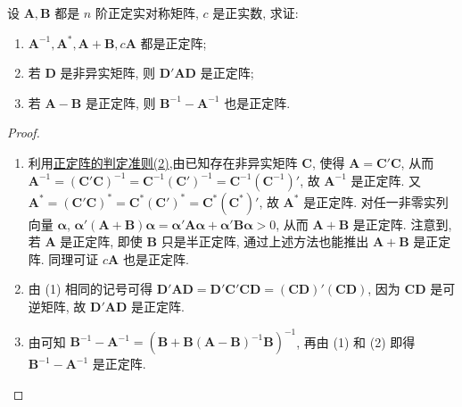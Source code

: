 \documentclass[../../main.tex]{subfiles}
\begin{document}
\begin{proposition}\label{proposition:正定阵的性质123}
设 \(\boldsymbol{A},\boldsymbol{B}\) 都是 \(n\) 阶正定实对称矩阵, \(c\) 是正实数, 求证:
\begin{enumerate}[(1)]
\item \(\boldsymbol{A}^{-1},\boldsymbol{A}^*,\boldsymbol{A}+\boldsymbol{B},c\boldsymbol{A}\) 都是正定阵;
\item 若 \(\boldsymbol{D}\) 是非异实矩阵, 则 \(\boldsymbol{D}'\boldsymbol{A}\boldsymbol{D}\) 是正定阵;
\item 若 \(\boldsymbol{A}-\boldsymbol{B}\) 是正定阵, 则 \(\boldsymbol{B}^{-1}-\boldsymbol{A}^{-1}\) 也是正定阵.
\end{enumerate}
\end{proposition}
\begin{proof}
\begin{enumerate}[(1)]
\item 利用\hyperref[proposition:正定阵的判定准则]{正定阵的判定准则(2)},由已知存在非异实矩阵 \(\boldsymbol{C}\), 使得 \(\boldsymbol{A}=\boldsymbol{C}'\boldsymbol{C}\), 从而 \(\boldsymbol{A}^{-1}=(\boldsymbol{C}'\boldsymbol{C})^{-1}=\boldsymbol{C}^{-1}(\boldsymbol{C}')^{-1}=\boldsymbol{C}^{-1}(\boldsymbol{C}^{-1})'\), 故 \(\boldsymbol{A}^{-1}\) 是正定阵. 又 \(\boldsymbol{A}^*=(\boldsymbol{C}'\boldsymbol{C})^*=\boldsymbol{C}^*(\boldsymbol{C}')^*=\boldsymbol{C}^*(\boldsymbol{C}^*)'\), 故 \(\boldsymbol{A}^*\) 是正定阵. 对任一非零实列向量 \(\boldsymbol{\alpha}\), \(\boldsymbol{\alpha}'(\boldsymbol{A}+\boldsymbol{B})\boldsymbol{\alpha}=\boldsymbol{\alpha}'\boldsymbol{A}\boldsymbol{\alpha}+\boldsymbol{\alpha}'\boldsymbol{B}\boldsymbol{\alpha}>0\), 从而 \(\boldsymbol{A}+\boldsymbol{B}\) 是正定阵. 注意到, 若 \(\boldsymbol{A}\) 是正定阵, 即使 \(\boldsymbol{B}\) 只是半正定阵, 通过上述方法也能推出 \(\boldsymbol{A}+\boldsymbol{B}\) 是正定阵. 同理可证 \(c\boldsymbol{A}\) 也是正定阵.
\item 由 (1) 相同的记号可得 \(\boldsymbol{D}'\boldsymbol{A}\boldsymbol{D}=\boldsymbol{D}'\boldsymbol{C}'\boldsymbol{C}\boldsymbol{D}=(\boldsymbol{C}\boldsymbol{D})'(\boldsymbol{C}\boldsymbol{D})\), 因为 \(\boldsymbol{C}\boldsymbol{D}\) 是可逆矩阵, 故 \(\boldsymbol{D}'\boldsymbol{A}\boldsymbol{D}\) 是正定阵. 
\item 由可知 \(\boldsymbol{B}^{-1}-\boldsymbol{A}^{-1}=(\boldsymbol{B}+\boldsymbol{B}(\boldsymbol{A}-\boldsymbol{B})^{-1}\boldsymbol{B})^{-1}\), 再由 (1) 和 (2) 即得 \(\boldsymbol{B}^{-1}-\boldsymbol{A}^{-1}\) 是正定阵. 
\end{enumerate}

\end{proof}
\end{document}
